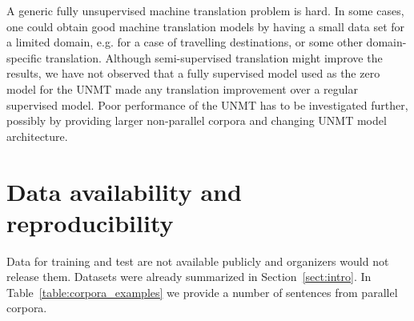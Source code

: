 \documentclass[]{article}
\begin{document}
A generic fully unsupervised machine translation problem is hard.
In some cases, one could obtain good machine translation models by having a small data set for a limited domain, e.g. for a case of travelling destinations, or some other domain-specific translation.
Although semi-supervised translation might improve the results, we have not observed that a fully supervised model used as the zero model for the UNMT made any translation improvement over a regular supervised model.
Poor performance of the UNMT has to be investigated further, possibly by providing larger non-parallel corpora and changing UNMT model architecture.

\section{Data availability and reproducibility}
\label{sect:data}

Data for training and test are not available publicly and organizers would not release them.
Datasets were already summarized in Section~\ref{sect:intro}.
In Table~\ref{table:corpora_examples} we provide a number of sentences from parallel corpora.
\end{document}
